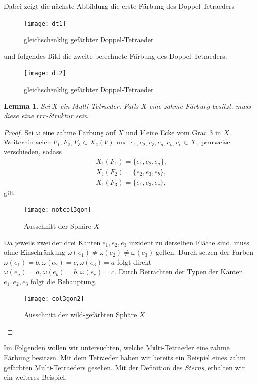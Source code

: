 \documentclass[12pt,titlepage,twoside,cleardoublepage]{article}
\theoremstyle{nummermitklammern}
\newtheorem{lemma}[temp]{Lemma}
\newtheorem{lemma}[zahl]{Lemma}
\numberwithin{equation}{section}
\begin{document}
Dabei zeigt die nächste Abbildung die erste Färbung des Doppel-Tetraeders 
\begin{figure}[H]
\begin{center}
\texttt{[image: dt1]}
\end{center}
\caption{gleichschenklig gefärbter Doppel-Tetraeder}
\end{figure}
und folgendes Bild die zweite berechnete Färbung des Doppel-Tetraeders.
\begin{figure}[H]
\begin{center}
\texttt{[image: dt2]}
\end{center}
\caption{gleichschenklig gefärbter Doppel-Tetraeder}
\end{figure}
\begin{lemma}
Sei $X$ ein Multi-Tetraeder. Falls $X$ eine zahme Färbung besitzt, muss diese eine $rrr$-Struktur sein.
\end{lemma}
\begin{proof}
Sei $\omega$ eine zahme Färbung auf $X$ und $V$ eine Ecke vom Grad 3 in $X.$ Weiterhin seien $F_1,F_2,F_3\in X_2(V)$ und $e_1,e_2,e_3,e_a,e_b,e_c\in X_1$ paarweise verschieden, sodass 
\begin{align*}
&X_1(F_1)=\{e_1,e_2,e_a\},\\
&X_1(F_2)=\{e_2,e_3,e_b\}, \\
&X_1(F_3)=\{e_1,e_3,e_c\},
\end{align*}
gilt.
\begin{figure}[H]
\begin{center}
\texttt{[image: notcol3gon]}
\end{center}
\caption{Ausschnitt der Sphäre $X$}
\end{figure}
Da jeweils zwei der drei Kanten $e_1,e_2,e_3$ inzident zu derselben Fläche sind, muss ohne Einschränkung $\omega(e_1)\neq\omega(e_2)\neq\omega(e_3)$ gelten. Durch setzen der Farben $\omega(e_1)=b,\omega(e_2)=c,\omega(e_3)=a$ folgt direkt $\omega(e_a)=a,\omega(e_b)=b,\omega(e_c)=c.$  Durch Betrachten der Typen der Kanten $e_1,e_2,e_3$ folgt die Behauptung.
\begin{figure}[H]
\begin{center}
\texttt{[image: col3gon2]}
\end{center}
\caption{Ausschnitt der wild-gefärbten Sphäre $X$}
\end{figure}
\end{proof}
Im Folgenden wollen wir untersuchten, welche Multi-Tetraeder eine zahme Färbung besitzen. Mit dem Tetraeder haben wir bereits ein Beispiel eines zahm gefärbten Multi-Tetraeders gesehen. Mit der Definition des \emph{Sterns}, erhalten wir ein weiteres Beispiel.
\end{document}
